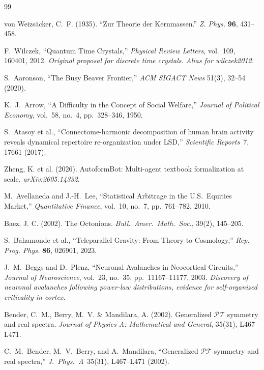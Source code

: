 \documentclass[12pt,oneside]{book}
\theoremstyle{principia}
\theoremstyle{definition}
\theoremstyle{remark}
\begin{document}
\begin{thebibliography}{99}

von Weizs\"acker, C.~F. (1935).
``Zur Theorie der Kernmassen.''
\textit{Z. Phys.} \textbf{96}, 431--458.

F.~Wilczek,
``Quantum Time Crystals,''
\emph{Physical Review Letters}, vol.~109, 160401, 2012.
\textit{Original proposal for discrete time crystals. Alias for wilczek2012.}

S.~Aaronson,
``The Busy Beaver Frontier,''
\emph{ACM SIGACT News} 51(3), 32--54 (2020).

K.~J.~Arrow,
``A Difficulty in the Concept of Social Welfare,''
\emph{Journal of Political Economy}, vol.~58, no.~4, pp.~328--346, 1950.

S.~Atasoy et al., ``Connectome-harmonic decomposition of human brain activity reveals dynamical repertoire re-organization under LSD,'' \emph{Scientific Reports}\ 7, 17661 (2017).

Zheng, K. et al. (2026). AutoformBot: Multi-agent textbook formalization at scale. \emph{arXiv:2605.14332}.

M.~Avellaneda and J.-H.~Lee,
``Statistical Arbitrage in the U.S.\ Equities Market,''
\emph{Quantitative Finance}, vol.~10, no.~7, pp.~761--782, 2010.

Baez, J. C. (2002). The Octonions. \emph{Bull.\ Amer.\ Math.\ Soc.}, 39(2), 145--205.

S.~Bahamonde et al., ``Teleparallel Gravity: From Theory to Cosmology,'' \emph{Rep. Prog. Phys.} \textbf{86}, 026901, 2023.

J.~M.~Beggs and D.~Plenz,
``Neuronal Avalanches in Neocortical Circuits,''
\emph{Journal of Neuroscience}, vol.~23, no.~35, pp.~11167--11177, 2003.
\textit{Discovery of neuronal avalanches following power-law distributions, evidence for self-organized criticality in cortex.}

Bender, C.~M., Berry, M.~V. \& Mandilara, A. (2002).
Generalized $\mathcal{PT}$ symmetry and real spectra.
\emph{Journal of Physics A: Mathematical and General}, 35(31), L467--L471.

C.~M.~Bender, M.~V.~Berry, and A.~Mandilara, ``Generalized $\mathcal{PT}$ symmetry and real spectra,'' \emph{J.\ Phys.\ A}\ 35(31), L467--L471 (2002).


\end{thebibliography}
\end{document}
